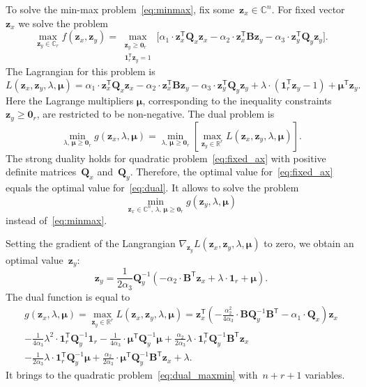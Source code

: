\documentclass[12pt,twoside]{article}
\theoremstyle{definition}
\newcommand{\bz}{\mathbf{z}}
\newcommand{\bB}{\mathbf{B}}
\newcommand{\bQ}{\mathbf{Q}}
\newcommand{\bbR}{\mathbb{R}}
\newcommand{\T}{\mathsf{T}}
\newcommand{\bmu}{\boldsymbol{\mu}}
\newcommand{\bOne}{\boldsymbol{1}}
\newcommand{\bZero}{\boldsymbol{0}}
\begin{document}
To solve the min-max problem~\eqref{eq:minmax}, fix some~$\bz_x \in \mathbb{C}^n$. For fixed vector~$\bz_x$ we solve the problem
\begin{equation}
\max_{\bz_y \in \mathbb{C}_r} f(\bz_x, \bz_y) = \max_{\substack{\bz_y \geq \bZero_r \\ \bOne_r^{\T}\bz_y=1}} \bigl[\alpha_1 \cdot \bz_x^{\T} \bQ_x \bz_x - \alpha_2 \cdot \bz_x^{\T} \bB \bz_y - \alpha_3 \cdot \bz_y^{\T} \bQ_y \bz_y \bigr].
\label{eq:fixed_ax}
\end{equation}
The Lagrangian for this problem is
\begin{equation*}
L(\bz_x, \bz_y, \lambda, \bmu) = \alpha_1 \cdot \bz_x^{\T} \bQ_x \bz_x - \alpha_2 \cdot \bz_x^{\T} \bB \bz_y - \alpha_3 \cdot \bz_y^{\T} \bQ_y \bz_y + \lambda \cdot  (\bOne_r^{\T} \bz_y - 1) + \bmu^{\T} \bz_y.
\end{equation*}
Here the Lagrange multipliers $\bmu$, corresponding to the inequality constraints $\bz_y \geq \bZero_r$, are restricted to be non-negative.
The dual problem is
\begin{equation}
\min_{\lambda, \, \bmu \geq \bZero_r} g(\bz_x, \lambda, \bmu) = \min_{\lambda, \, \bmu \geq \bZero_r}  \left[\max_{\bz_y \in \bbR^r} L(\bz_x, \bz_y, \lambda, \bmu) \right].
\label{eq:dual}
\end{equation}
The strong duality holds for quadratic problem~\eqref{eq:fixed_ax} with positive definite matrices~$\bQ_x$ and~$\bQ_y$. Therefore, the optimal value for~\eqref{eq:fixed_ax} equals the optimal value for~\eqref{eq:dual}. It allows to solve the problem
\begin{equation}
\min_{\bz_x \in \mathbb{C}^n, \, \lambda, \, \bmu \geq \bZero_r} g(\bz_y, \lambda, \bmu)
\label{eq:dual_maxmin}
\end{equation}
instead of~\eqref{eq:minmax}.

Setting the gradient of the Langrangian $\nabla_{\bz_y} L(\bz_x, \bz_y, \lambda, \bmu)$ to zero, we obtain an optimal value~$\bz_y$:
\begin{equation}
\bz_y = \frac{1}{2\alpha_3} \bQ_y^{-1} \left( - \alpha_2 \cdot \bB^{\T} \bz_x +\lambda \cdot \bOne_r + \bmu \right).
\label{eq:ax}
\end{equation}
The dual function is equal to
\begin{multline}
g(\bz_x, \lambda, \bmu)
= \max_{\bz_y \in \bbR^r} L(\bz_x, \bz_y, \lambda, \bmu) =
\bz_x^{\T} \left( - \frac{\alpha_2^2}{4\alpha_3} \cdot \bB \bQ_y^{-1} \bB^{\T} - \alpha_1 \cdot \bQ_x\right) \bz_x \\ - \frac{1}{4 \alpha_3} \lambda^2 \cdot \bOne_r^{\T} \bQ_y^{-1} \bOne_r - \frac{1}{4 \alpha_3} \cdot \bmu^{\T} \bQ_y^{-1} \bmu + \frac{\alpha_2}{2 \alpha_3} \lambda \cdot \bOne_r^{\T} \bQ_y^{-1} \bB^{\T} \bz_x \\ - \frac{1}{2 \alpha_3} \lambda \cdot \bOne_r^{\T} \bQ_y^{-1} \bmu + \frac{\alpha_2}{2 \alpha_3} \cdot \bmu^{\T} \bQ_y^{-1} \bB^{\T} \bz_x + \lambda.
\label{eq:dual_quadratic_form}
\end{multline}
It brings to the quadratic problem~\eqref{eq:dual_maxmin} with~$n + r + 1$ variables.
\end{document}
